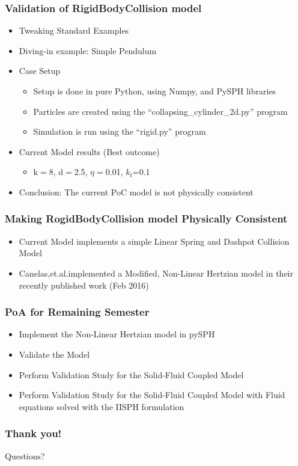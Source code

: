 \documentclass{beamer}
\begin{document}
 \begin{frame} %
  \frametitle{Validation of RigidBodyCollision model}
  	\begin{itemize}
  	 \item Tweaking Standard Examples \pause
  	 \item Diving-in example: Simple Pendulum \pause
  	 \item Case Setup
  	 	\begin{itemize}
  	 	 \item Setup is done in pure Python, using Numpy, and PySPH libraries 
  	 	 \item Particles are created using the ``collapsing\_cylinder\_2d.py'' program
  	 	 \item Simulation is run using the ``rigid.py'' program
  	 	\end{itemize}\pause
  	 \item Current Model results (Best outcome)
  	 \begin{itemize}
  	  \item k$=$8, d$=$2.5, $\eta=$0.01, $k_{t}$=0.1
  	 \end{itemize} \pause
  	 \item Conclusion: The current PoC model is not physically consistent
    \end{itemize}
 \end{frame}
  
 \begin{frame} %
  \frametitle{Making RogidBodyCollision model Physically Consistent}
  \begin{itemize}
   \item Current Model implements a simple Linear Spring and Dashpot Collision Model \pause
   \item Canelas,et.al.\footnotemark  implemented a Modified, Non-Linear Hertzian model in their recently published work (Feb 2016)
  \end{itemize}
 \end{frame}
 
 \begin{frame} %
  \frametitle{PoA for Remaining Semester}
  \begin{itemize}
   \item Implement the Non-Linear Hertzian model in pySPH
   \item Validate the Model \pause
   \item Perform Validation Study for the Solid-Fluid Coupled Model \pause
   \item Perform Validation Study for the Solid-Fluid Coupled Model with Fluid equations  solved with the IISPH formulation
  \end{itemize}
 \end{frame}

 \begin{frame} %
  \frametitle{Thank you!}

  \begin{center}
    \large{Questions?}   
  \end{center}    
  
 \end{frame}
\end{document}
